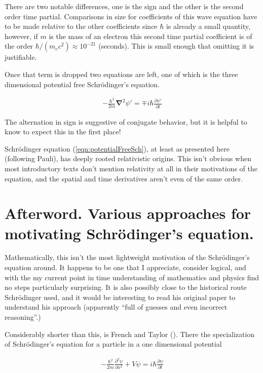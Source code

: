 \documentclass[]{eliblog}
\newcommand{\spacegrad}[0]{\boldsymbol{\nabla}}
\begin{document}
There are two notable differences, one is the sign and the other is the second order time partial.  
Comparisons in size for coefficients of this wave equation have to be made relative to the other coefficients since $\hbar$ is already a small quantity,
however, if $m$ is the mass of an electron this second time partial coefficient is of the order $\hbar/(m_e c^2) \approx 10^{-21}$ (seconds).  This is
small enough that omitting it is justifiable.

Once that term is dropped two equations are left, one of which is the three dimensional potential free Schr\"{o}dinger's equation.

\begin{align}\label{eqn:potentialFreeSch}
-\frac{\hbar^2}{2m} \spacegrad^2 \psi' = \mp i \hbar \frac{\partial \psi'}{\partial t}
\end{align}

The alternation in sign is suggestive of conjugate behavior, but it is helpful to know to expect this in the first place!

Schr\"{o}dinger equation (\ref{eqn:potentialFreeSch}), at least as presented here (following Pauli), has deeply rooted relativistic origins.
This isn't obvious when most introductory texts don't mention relativity at all in their motivations of the equation, and
the spatial and time derivatives aren't even of the same order.

\section{Afterword.  Various approaches for motivating Schr\"{o}dinger's equation.}

Mathematically, this isn't the most lightweight motivation of the Schr\"{o}dinger's equation around.  It happens to be one that I appreciate, consider
logical, and with the my current point in time understanding of mathematics and physics find no steps particularly surprising.
It is also possibly close to the historical route Schr\"{o}dinger used, and it would be interesting to read his original paper to understand his approach (apparently ``full of guesses and even incorrect reasoning''.)

Considerably shorter than this, is French and Taylor (\cite{french1998iqp}).  There the specialization of Schr\"{o}dinger's equation for a particle in a one dimensional potential

\begin{align}\label{eqn:oneDimSch}
-\frac{\hbar^2}{2m} \frac{\partial^2 \psi}{\partial x^2} + V\psi = i \hbar \frac{\partial \psi}{\partial t}
\end{align}
\end{document}
